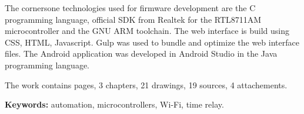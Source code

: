 The cornersone technologies used for firmware development are the C programming language, official SDK from Realtek for the RTL8711AM microcontroller and the GNU ARM toolchain. The web interface is build using CSS, HTML, Javascript. Gulp was used to bundle and optimize the web interface files. The Android application was developed in Android Studio in the Java programming language. 

The work contains \pageref{LastPage} pages, 3 chapters, 21 drawings, 19 sources, 4 attachements.

\textbf{Keywords:} automation, microcontrollers, Wi-Fi, time relay.

